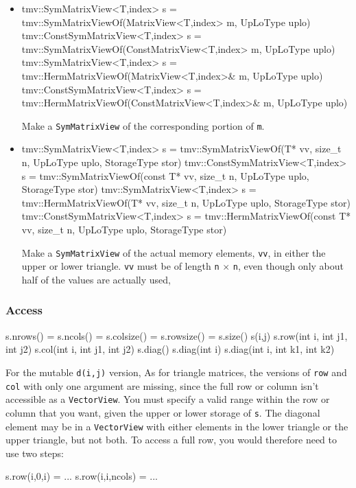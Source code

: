 \documentclass[twoside,letterpaper,11pt]{article}
\renewcommand{\tt}[1]{{\lstinline {#1}}}
\begin{document}
\begin{itemize}
\item
\begin{tmvcode}
tmv::SymMatrixView<T,index> s = 
      tmv::SymMatrixViewOf(MatrixView<T,index> m, UpLoType uplo)
tmv::ConstSymMatrixView<T,index> s = 
      tmv::SymMatrixViewOf(ConstMatrixView<T,index> m, UpLoType uplo)
tmv::SymMatrixView<T,index> s = 
      tmv::HermMatrixViewOf(MatrixView<T,index>& m, UpLoType uplo)
tmv::ConstSymMatrixView<T,index> s = 
      tmv::HermMatrixViewOf(ConstMatrixView<T,index>& m, UpLoType uplo)
\end{tmvcode}
Make a \tt{SymMatrixView} of the corresponding portion of \tt{m}.

\item
\begin{tmvcode}
tmv::SymMatrixView<T,index> s = 
      tmv::SymMatrixViewOf(T* vv, size_t n, UpLoType uplo, 
      StorageType stor)
tmv::ConstSymMatrixView<T,index> s =
      tmv::SymMatrixViewOf(const T* vv, size_t n, UpLoType uplo, 
      StorageType stor)
tmv::SymMatrixView<T,index> s =
      tmv::HermMatrixViewOf(T* vv, size_t n, UpLoType uplo, 
      StorageType stor)
tmv::ConstSymMatrixView<T,index> s =
      tmv::HermMatrixViewOf(const T* vv, size_t n, UpLoType uplo, 
      StorageType stor)
\end{tmvcode}
Make a \tt{SymMatrixView} of the actual memory elements, \tt{vv}, in either the 
upper or lower triangle.
\tt{vv} must be of length \tt{n} $\times$ \tt{n}, even though only about half 
of the values are actually used,

\end{itemize}

\subsubsection{Access}

\begin{tmvcode}
s.nrows() = s.ncols() = s.colsize() = s.rowsize() = s.size()
s(i,j)
s.row(int i, int j1, int j2)
s.col(int i, int j1, int j2)
s.diag()
s.diag(int i)
s.diag(int i, int k1, int k2)
\end{tmvcode}
For the mutable \tt{d(i,j)} version, 
As for triangle matrices, the versions of \tt{row} and \tt{col} with only one argument are
missing, since the full row or column isn't accessible as a \tt{VectorView}.
You must specify a valid range within the row or column that you want, 
given the upper or lower storage of \tt{s}.
The diagonal element may be in a \tt{VectorView} with either elements in the 
lower triangle or the upper triangle, but not both.  To access a full row, you would 
therefore need to use two steps:
\begin{tmvcode}
s.row(i,0,i) = ...
s.row(i,i,ncols) = ...
\end{tmvcode}
\end{document}
